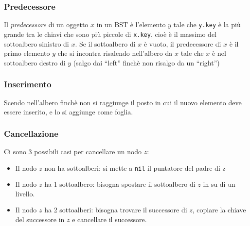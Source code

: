 \documentclass[10pt,a4paper]{article}
\newcommand{\code}{\texttt}
\begin{document}
\begin{multicols*}{2}
\subsubsection*{Predecessore}
Il \emph{predecessore} di un oggetto $x$ in un BST è l'elemento $y$ tale che \code{y.key} è la più grande tra le chiavi che sono più piccole di \code{x.key}, cioè è il massimo del sottoalbero sinistro di $x$. Se il sottoalbero di $x$ è vuoto, il predecessore di $x$ è il primo elemento $y$ che si incontra risalendo nell'albero da $x$ tale che $x$ è nel sottoalbero destro di $y$ (\small{salgo dai ``left'' finchè non risalgo da un ``right''})

\subsubsection*{Inserimento}
Scendo nell'albero finchè non si raggiunge il posto in cui il nuovo elemento deve essere inserito, e lo si aggiunge come foglia.

\subsubsection*{Cancellazione} Ci sono 3 possibili casi per cancellare un nodo $z$:
\begin{itemize}
    \item Il nodo $z$ non ha sottoalberi: si mette a \code{nil} il puntatore del padre di z
    \item Il nodo $z$ ha 1 sottoalbero: bisogna spostare il sottoalbero di $z$ in su di un livello.
    \item Il nodo $z$ ha 2 sottoalberi: bisogna trovare il successore di $z$, copiare la chiave del successore in $z$ e cancellare il successore.
\end{itemize}


\end{multicols*}
\end{document}
